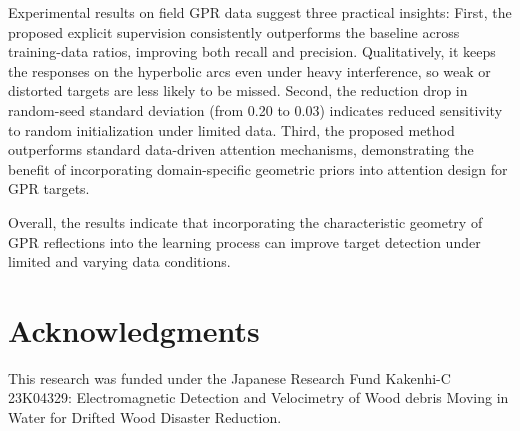 \documentclass[lettersize,journal]{IEEEtran}
\begin{document}
Experimental results on field GPR data suggest three practical  insights: 
First, the proposed explicit supervision consistently outperforms the baseline across training-data ratios, improving both recall and precision. Qualitatively, it keeps the responses on the hyperbolic arcs even under heavy interference, so weak or distorted targets are less likely to be missed. 
Second, the reduction drop in random-seed standard deviation (from 0.20 to 0.03) indicates reduced sensitivity to random initialization under limited data.
Third, the proposed method outperforms standard data-driven attention mechanisms, demonstrating the benefit of incorporating domain-specific geometric priors into attention design for GPR targets. 

Overall, the results indicate that incorporating the characteristic geometry of GPR reflections into the learning process can improve target detection under limited and varying data conditions.






\section*{Acknowledgments}
This research was funded under the Japanese Research Fund Kakenhi-C 23K04329: Electromagnetic Detection and Velocimetry of Wood debris Moving in Water for Drifted Wood Disaster Reduction.
\end{document}
